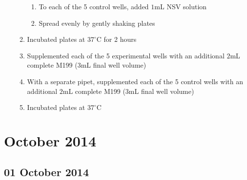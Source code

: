 \begin{enumerate}
\begin{enumerate}
\begin{enumerate}
					\item To each of the 5 control wells, added $1$mL NSV solution
					\item Spread evenly by gently shaking plates
				\end{enumerate}
			\item Incubated plates at $37^{\circ}$C for 2 hours
			\item Supplemented each of the 5 experimental wells with an additional $2$mL complete M199 ($3$mL final well volume)
			\item With a separate pipet, supplemented each of the 5 control wells with an additional $2$mL complete M199 ($3$mL final well volume)
			\item Incubated plates at $37^{\circ}$C
		\end{enumerate}
\end{enumerate}

\section{October 2014}

\subsection*{01 October 2014}

